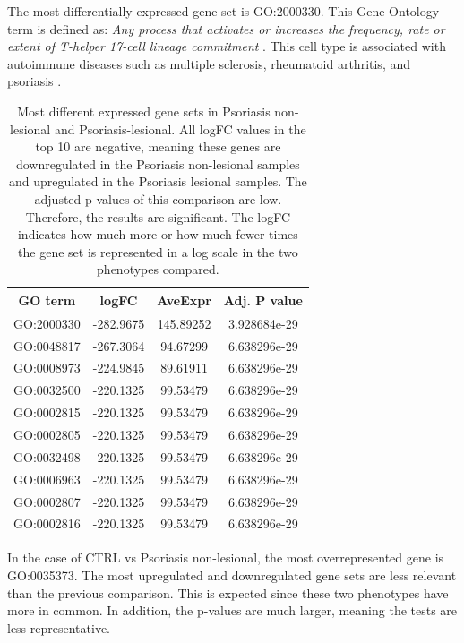 \documentclass[aps,prb,twocolumn,superscriptaddress,floatfix,longbibliography]{revtex4-2}
\newif\ifptitle
\newif\ifpnumber
\newcounter{para}
\newcommand\ptitle[1]{\par\refstepcounter{para}
{\ifpnumber{\noindent\textcolor{lightgray}{\textbf{\thepara}}\indent}\fi}
{\ifptitle{\textbf{[{#1}]}}\fi}}
\begin{document}
The most differentially expressed gene set is GO:2000330. This Gene Ontology term is defined as: \textit{Any process that activates or increases the frequency, rate or extent of T-helper 17-cell lineage commitment} \cite{go:2000330}. This cell type is associated with autoimmune diseases such as multiple sclerosis, rheumatoid arthritis, and psoriasis \cite{wiki:Th17}.

\begin{table}[H]
\centering
\label{tab:pssolvspsol}
\caption{Most different expressed gene sets in Psoriasis non-lesional and Psoriasis-lesional. All logFC values in the top 10 are negative, meaning these genes are downregulated in the Psoriasis non-lesional samples and upregulated in the Psoriasis lesional samples. The adjusted p-values of this comparison are low. Therefore, the results are significant. The logFC indicates how much more or how much fewer times the gene set is represented in a log scale in the two phenotypes compared.}
\begin{tabular}{ | c @{\hspace{0.3cm}} c @{\hspace{0.3cm}} c @{\hspace{0.3cm}} c | }
    \hline
    GO term & logFC & AveExpr & Adj. P value  \\
    \hline
    \hline
    GO:2000330 & -282.9675 & 145.89252 & 3.928684e-29 \\
    GO:0048817 & -267.3064 & 94.67299 & 6.638296e-29 \\
    GO:0008973 & -224.9845 & 89.61911 & 6.638296e-29 \\
    GO:0032500 & -220.1325 & 99.53479 & 6.638296e-29 \\
    GO:0002815 & -220.1325 & 99.53479 & 6.638296e-29 \\
    GO:0002805 & -220.1325 & 99.53479 & 6.638296e-29 \\
    GO:0032498 & -220.1325 & 99.53479 & 6.638296e-29 \\
    GO:0006963 & -220.1325 & 99.53479 & 6.638296e-29 \\
    GO:0002807 & -220.1325 & 99.53479 & 6.638296e-29 \\
    GO:0002816 & -220.1325 & 99.53479 & 6.638296e-29 \\
    \hline
\end{tabular}
\end{table}

\ptitle{Control vs Psoriasis non-lesional}

In the case of CTRL vs Psoriasis non-lesional, the most overrepresented gene is GO:0035373. The most upregulated and downregulated gene sets are less relevant than the previous comparison. This is expected since these two phenotypes have more in common. In addition, the p-values are much larger, meaning the tests are less representative.
\end{document}
